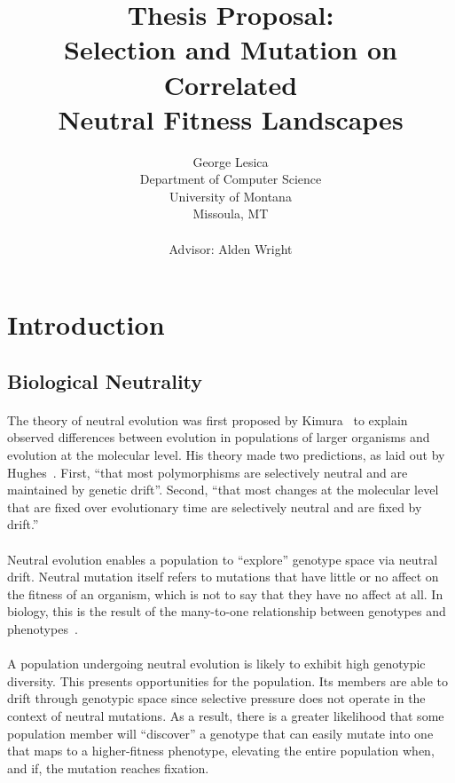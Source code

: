 \documentclass[12pt,letterpaper,titlepage,draft]{article}
\title{Thesis Proposal:\\
Selection and Mutation on Correlated\\
Neutral Fitness Landscapes}
\author{George Lesica\\
Department of Computer Science\\
University of Montana\\
Missoula, MT\\
\\
Advisor: Alden Wright}
\begin{document}
\maketitle

\section{Introduction}

\subsection{Biological Neutrality}

\paragraph{}
The theory of neutral evolution was first proposed by Kimura~\cite{Kimura1984}
to explain observed differences between evolution in populations of larger
organisms and evolution at the molecular level. His theory made two
predictions, as laid out by Hughes~\cite{Hughes2007}. First, ``that most
polymorphisms are selectively neutral and are maintained by genetic drift''.
Second, ``that most changes at the molecular level that are fixed over
evolutionary time are selectively neutral and are fixed by drift.''

\paragraph{}
Neutral evolution enables a population to ``explore'' genotype space via
neutral drift. Neutral mutation itself refers to mutations that have little or
no affect on the fitness of an organism, which is not to say that they have no
affect at all. In biology, this is the result of the many-to-one relationship
between genotypes and phenotypes~\cite{Newman1998}.

\paragraph{}
A population undergoing neutral evolution is likely to exhibit high genotypic
diversity. This presents opportunities for the population. Its members are able
to drift through genotypic space since selective pressure does not operate in
the context of neutral mutations. As a result, there is a greater likelihood
that some population member will ``discover'' a genotype that can easily mutate
into one that maps to a higher-fitness phenotype, elevating the entire
population when, and if, the mutation reaches fixation.
\end{document}
